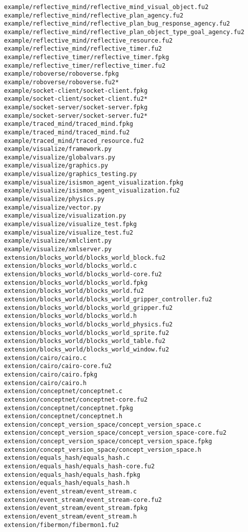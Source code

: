 \begin{lstlisting}
example/reflective_mind/reflective_mind_visual_object.fu2
example/reflective_mind/reflective_plan_agency.fu2
example/reflective_mind/reflective_plan_bug_response_agency.fu2
example/reflective_mind/reflective_plan_object_type_goal_agency.fu2
example/reflective_mind/reflective_resource.fu2
example/reflective_mind/reflective_timer.fu2
example/reflective_timer/reflective_timer.fpkg
example/reflective_timer/reflective_timer.fu2
example/roboverse/roboverse.fpkg
example/roboverse/roboverse.fu2*
example/socket-client/socket-client.fpkg
example/socket-client/socket-client.fu2*
example/socket-server/socket-server.fpkg
example/socket-server/socket-server.fu2*
example/traced_mind/traced_mind.fpkg
example/traced_mind/traced_mind.fu2
example/traced_mind/traced_resource.fu2
example/visualize/framework.py
example/visualize/globalvars.py
example/visualize/graphics.py
example/visualize/graphics_testing.py
example/visualize/isismon_agent_visualization.fpkg
example/visualize/isismon_agent_visualization.fu2
example/visualize/physics.py
example/visualize/vector.py
example/visualize/visualization.py
example/visualize/visualize_test.fpkg
example/visualize/visualize_test.fu2
example/visualize/xmlclient.py
example/visualize/xmlserver.py
extension/blocks_world/blocks_world_block.fu2
extension/blocks_world/blocks_world.c
extension/blocks_world/blocks_world-core.fu2
extension/blocks_world/blocks_world.fpkg
extension/blocks_world/blocks_world.fu2
extension/blocks_world/blocks_world_gripper_controller.fu2
extension/blocks_world/blocks_world_gripper.fu2
extension/blocks_world/blocks_world.h
extension/blocks_world/blocks_world_physics.fu2
extension/blocks_world/blocks_world_sprite.fu2
extension/blocks_world/blocks_world_table.fu2
extension/blocks_world/blocks_world_window.fu2
extension/cairo/cairo.c
extension/cairo/cairo-core.fu2
extension/cairo/cairo.fpkg
extension/cairo/cairo.h
extension/conceptnet/conceptnet.c
extension/conceptnet/conceptnet-core.fu2
extension/conceptnet/conceptnet.fpkg
extension/conceptnet/conceptnet.h
extension/concept_version_space/concept_version_space.c
extension/concept_version_space/concept_version_space-core.fu2
extension/concept_version_space/concept_version_space.fpkg
extension/concept_version_space/concept_version_space.h
extension/equals_hash/equals_hash.c
extension/equals_hash/equals_hash-core.fu2
extension/equals_hash/equals_hash.fpkg
extension/equals_hash/equals_hash.h
extension/event_stream/event_stream.c
extension/event_stream/event_stream-core.fu2
extension/event_stream/event_stream.fpkg
extension/event_stream/event_stream.h
extension/fibermon/fibermon1.fu2

\end{lstlisting}
